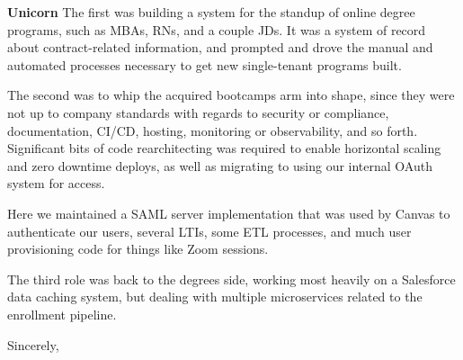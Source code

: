 \documentclass[11pt]{letter} %
\begin{document}
\begin{letter}{\large \bfseries Unicorn}
The first was building a system for the standup of online degree programs, such as MBAs,
RNs, and a couple JDs.  It was a system of record about contract-related information, and
prompted and drove the manual and automated processes necessary to get new single-tenant
programs built.

The second was to whip the acquired bootcamps arm into shape, since they were not up to
company standards with regards to security or compliance, documentation, CI/CD, hosting,
monitoring or observability, and so forth.  Significant bits of code rearchitecting was
required to enable horizontal scaling and zero downtime deploys, as well as migrating
to using our internal OAuth system for access.

Here we maintained a SAML server implementation that was used by Canvas to authenticate
our users, several LTIs, some ETL processes, and much user provisioning code for things
like Zoom sessions.

The third role was back to the degrees side, working most heavily on a Salesforce data
caching system, but dealing with multiple microservices related to the enrollment
pipeline.

\closing{Sincerely,}


\end{letter}
\end{document}
